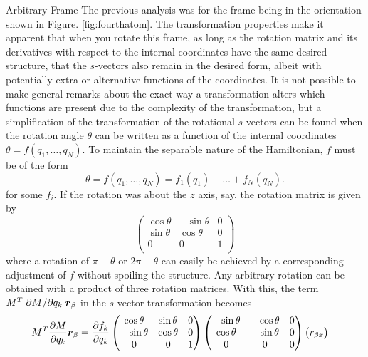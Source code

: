 \documentclass{article}
\newcommand{\fig}[1]{Figure. #1}
\newcommand{\vect}[1]{\boldsymbol{#1}}
\begin{document}
\begin{subsection}{Arbitrary Frame}
	The previous analysis was for the frame being in the orientation shown in \fig{\ref{fig:fourthatom}}. The transformation properties make it apparent that when you rotate this frame, as long as the rotation matrix and its derivatives with respect to the internal coordinates have the same desired structure, that the $s$-vectors also remain in the desired form, albeit with potentially extra or alternative functions of the coordinates. It is not possible to make general remarks about the exact way a transformation alters which functions are present due to the complexity of the transformation, but a simplification of the transformation of the rotational $s$-vectors can be found when the rotation angle $\theta$ can be written as a function of the internal coordinates $\theta = f(q_1, \ldots, q_N)$. To maintain the separable nature of the Hamiltonian, $f$ must be of the form 
	\[
		\theta = f(q_1, \ldots, q_N) = f_1(q_1) + \ldots + f_N(q_N). 
	\]
for some $f_i$. If the rotation was about the $z$ axis, say, the rotation matrix is given by 
	\[
		\begin{pmatrix}
		\cos \theta & - \sin \theta & 0 \\
		\sin \theta & \cos \theta & 0 \\
		0 & 0 & 1 \\
		\end{pmatrix}
	\]
where a rotation of $\pi - \theta$ or $2\pi -\theta$ can easily be achieved by a corresponding
			adjustment of $f$ without spoiling the structure. Any arbitrary rotation can be obtained with a product of three rotation matrices. With this, the term $M^T \pdv*{M}{q_k}\vect{r}_\beta$ in the $s$-vector transformation becomes
\[
	\begin{split}
		M^T \pdv{M}{q_k}\vect{r}_\beta &= \pdv{f_k}{q_k}	\begin{pmatrix}
		\cos \theta &  \sin \theta & 0 \\
		-\sin \theta & \cos \theta & 0 \\
		0 & 0 & 1 \\
		\end{pmatrix} \begin{pmatrix}
		-\sin \theta & -\cos \theta & 0 \\
		\cos \theta & -\sin \theta & 0 \\
		0 & 0 & 0 \\ 
	\end{pmatrix}
			\begin{pmatrix}
			r_{\beta x} \\

\end{pmatrix}
\end{split}\]
\end{subsection}
\end{document}

